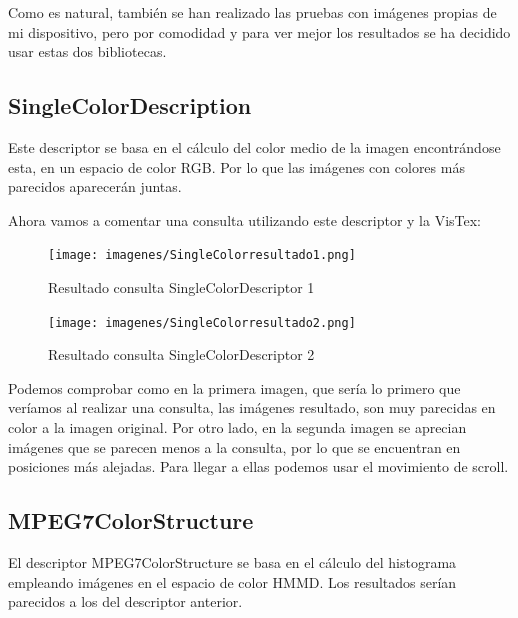 Como es natural, también se han realizado las pruebas con imágenes propias de mi dispositivo, pero por comodidad y para ver mejor los resultados se ha decidido usar estas dos bibliotecas.


\subsection{SingleColorDescription}

Este descriptor se basa en el cálculo del color medio de la imagen encontrándose esta, en un espacio de color RGB. Por lo que las imágenes con colores más parecidos aparecerán juntas.

Ahora vamos a comentar una consulta utilizando este descriptor y la VisTex:

\begin{figure}[H] %
\centering
\texttt{[image: imagenes/SingleColorresultado1.png]}  %
\label{SingleColorresultado1.png}
\caption{Resultado consulta SingleColorDescriptor 1 }
\end{figure}

\begin{figure}[H] %
\centering
\texttt{[image: imagenes/SingleColorresultado2.png]}  %
\label{SingleColorresultado2.png}
\caption{Resultado consulta SingleColorDescriptor 2 }
\end{figure}

Podemos comprobar como en la primera imagen, que sería lo primero que veríamos al realizar una consulta, las imágenes resultado, son muy parecidas en color a la imagen original. Por otro lado, en la segunda imagen se aprecian imágenes que se parecen menos a la consulta, por lo que se encuentran en posiciones más alejadas. Para llegar a ellas podemos usar el movimiento de scroll.


\subsection{MPEG7ColorStructure}

El descriptor MPEG7ColorStructure se basa en el cálculo del histograma empleando imágenes en el espacio de color HMMD. Los resultados serían parecidos a los del descriptor anterior.

